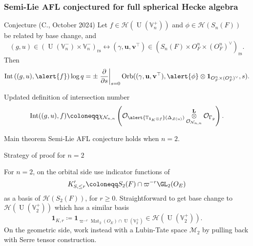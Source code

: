 \documentclass[11pt]{beamer}
\DeclareMathOperator{\Int}{Int}
\DeclareMathOperator{\Mat}{Mat}
\DeclareMathOperator{\Orb}{Orb}
\DeclareMathOperator{\U}{U}
\newcommand{\HH}{\mathcal{H}}
\newcommand{\VV}{\mathbb{V}}
\newcommand{\TT}{\mathbb{T}}
\renewcommand{\OO}{O}
\newcommand{\RZ}{\mathcal{N}}
\newcommand{\Sheaf}{\mathcal O}
\newcommand{\ZD}{\mathcal{Z}}
\newcommand{\guv}{{(\gamma, \uu, \vv^\top)}}
\newcommand{\jiao}{\mathop{\otimes}^{\mathbf{L}}} %
\newcommand{\oneV}{\mathbf{1}_{\OO_F^n \times (\OO_F^n)^\vee}}
\newcommand{\rs}{_{\text{rs}}}
\newcommand{\uu}{\mathbf{u}}
\newcommand{\vv}{\mathbf{v}}
\begin{document}
\begin{frame}
  \frametitle{Semi-Lie AFL conjectured for full spherical Hecke algebra}
  \begin{exampleblock}{Conjecture (C., October 2024)}
    Let \alert{$f \in \HH(\U(\VV_n^+))$} and \alert{$\phi \in \HH(S_n(F))$}
    be \alert{related by base change}, and
    \[ (g, u) \in (\U(\VV_n^-) \times \VV_n^-)\rs \longleftrightarrow
    (\gamma, \uu, \vv^\top) \in (S_n(F) \times \OO_F^n \times (\OO_F^n)^\vee)\rs. \]
    Then
    \[
      \Int\left( (g,u), \alert{f} \right) \log q
      = \pm \left. \pdv{}{s} \right\rvert_{s=0}
      \Orb(\guv, \alert{\phi} \otimes \oneV, s).
    \]
  \end{exampleblock}
  \begin{block}{Updated definition of intersection number}
    \[
      \Int((g,u), f)
      \coloneqq \chi_{\RZ_{n,n}} \left(
      \Sheaf_{\alert{\TT_{\mathbf{1}_K \otimes f}}(\Delta_{\ZD(u)})}
      \jiao_{\Sheaf_{\RZ_{n,n}}} \Sheaf_{\Gamma_g} \right).
    \]
  \end{block}
\end{frame}
\begin{frame}
  \begin{exampleblock}{Main theorem}
    Semi-Lie AFL conjecture holds when $n = 2$.
  \end{exampleblock}
  \begin{block}{Strategy of proof for $n = 2$}
    \begin{itemize}
      \ii For $n = 2$, on the orbital side use indicator functions of
      \[ K'_{S, \le r} \coloneqq S_2(F) \cap \varpi^{-r} \GL_2(\OO_E) \]
      as a basis of $\HH(S_2(F))$, for $r \ge 0$.
      \ii Straightforward to get base change to $\HH(\U(\VV_2^+))$ which has a similar basis
      \[ \mathbf{1}_{K, r} \coloneqq
        \mathbf{1}_{\varpi^{-r} \Mat_2(\OO_E) \cap \U(\VV_2^+)} \in \HH(\U(\VV_2^+)). \]
      \ii On the geometric side, work instead with a Lubin-Tate space $\mathcal{M}_2$
      by pulling back with Serre tensor construction.
    \end{itemize}
  \end{block}
\end{frame}
\end{document}
